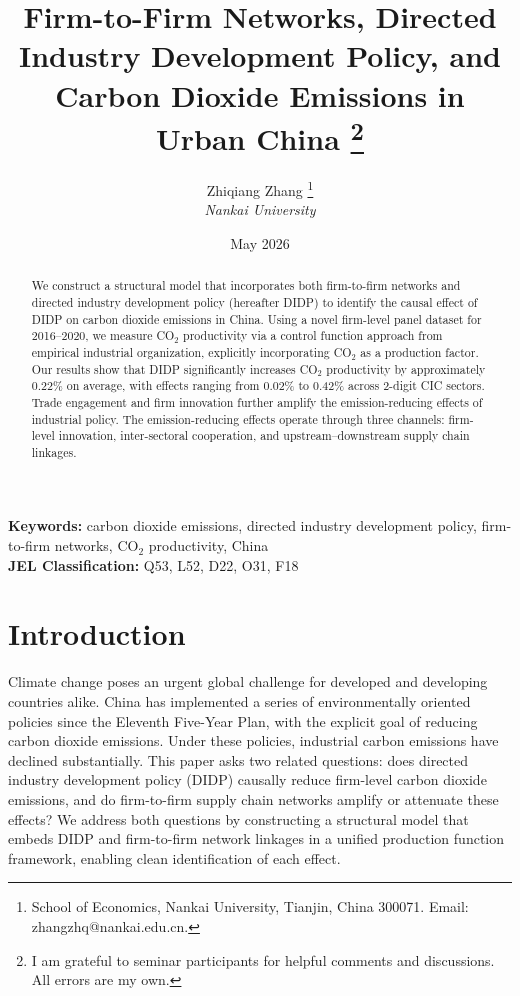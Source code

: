 \documentclass[11pt,a4paper]{article}
\title{Firm-to-Firm Networks, Directed Industry Development Policy, and\\
Carbon Dioxide Emissions in Urban China%
\thanks{I am grateful to seminar participants for helpful comments and discussions. All errors are my own.}}
\author{Zhiqiang Zhang%
\thanks{School of Economics, Nankai University, Tianjin, China 300071.
Email: zhangzhq@nankai.edu.cn.}\\[0.3em]
\textit{Nankai University}}
\date{May 2026}
\begin{document}
\maketitle
\thispagestyle{empty}

\begin{abstract}
We construct a structural model that incorporates both firm-to-firm networks and directed industry development policy (hereafter DIDP) to identify the causal effect of DIDP on carbon dioxide emissions in China. Using a novel firm-level panel dataset for 2016--2020, we measure CO$_2$ productivity via a control function approach from empirical industrial organization, explicitly incorporating CO$_2$ as a production factor. Our results show that DIDP significantly increases CO$_2$ productivity by approximately 0.22\% on average, with effects ranging from 0.02\% to 0.42\% across 2-digit CIC sectors. Trade engagement and firm innovation further amplify the emission-reducing effects of industrial policy. The emission-reducing effects operate through three channels: firm-level innovation, inter-sectoral cooperation, and upstream--downstream supply chain linkages.
\end{abstract}

\medskip
\noindent\textbf{Keywords:} carbon dioxide emissions, directed industry development policy,
firm-to-firm networks, CO$_2$ productivity, China\\[0.4em]
\noindent\textbf{JEL Classification:} Q53, L52, D22, O31, F18

\newpage
\setcounter{page}{1}

\section{Introduction}

Climate change poses an urgent global challenge for developed and developing countries alike. China has implemented a series of environmentally oriented policies since the Eleventh Five-Year Plan, with the explicit goal of reducing carbon dioxide emissions. Under these policies, industrial carbon emissions have declined substantially. This paper asks two related questions: does directed industry development policy (DIDP) causally reduce firm-level carbon dioxide emissions, and do firm-to-firm supply chain networks amplify or attenuate these effects? We address both questions by constructing a structural model that embeds DIDP and firm-to-firm network linkages in a unified production function framework, enabling clean identification of each effect.
\end{document}

